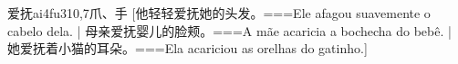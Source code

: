 \begin{EntryWithPhonetic}{爱抚}{ai4fu3}{10,7}{⽖、⼿}
  [他轻轻爱抚她的头发。===Ele afagou suavemente o cabelo dela. | 母亲爱抚婴儿的脸颊。===A mãe acaricia a bochecha do bebê. | 她爱抚着小猫的耳朵。===Ela acariciou as orelhas do gatinho.]
\end{EntryWithPhonetic}

